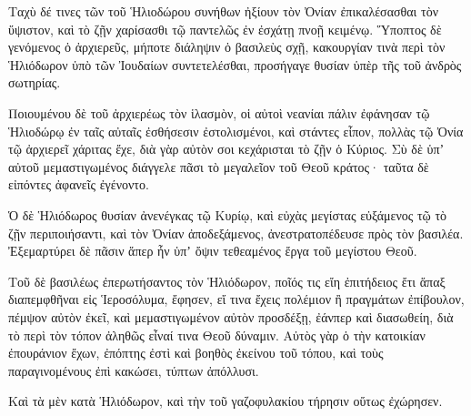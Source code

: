 {\par }{\PP {}Ταχὺ δέ τινες τῶν τοῦ Ἡλιοδώρου συνήθων ἠξίουν τὸν Ὀνίαν ἐπικαλέσασθαι τὸν ὕψιστον, καὶ τὸ ζῇν χαρίσασθι τῷ παντελῶς ἐν ἐσχάτῃ πνοῇ κειμένῳ.
Ὕποπτος δὲ γενόμενος ὁ ἀρχιερεῦς, μήποτε διάληψιν ὁ βασιλεὺς σχῇ, κακουργίαν τινὰ περὶ τὸν Ἡλιόδωρον ὑπὸ τῶν Ἰουδαίων συντετελέσθαι, προσήγαγε θυσίαν ὑπὲρ τῆς τοῦ ἀνδρὸς σωτηρίας.
\par }{\PP {}Ποιουμένου δὲ τοῦ ἀρχιερέως τὸν ἱλασμὸν, οἱ αὐτοὶ νεανίαι πάλιν ἐφάνησαν τῷ Ἡλιοδώρῳ ἐν ταῖς αὐταῖς ἐσθήσεσιν ἐστολισμένοι, καὶ στάντες εἶπον, πολλὰς τῷ Ὀνία τῷ ἀρχιερεῖ χάριτας ἔχε, διὰ γὰρ αὐτὸν σοι κεχάρισται τὸ ζῇν ὁ Κύριος.
Σὺ δὲ ὑπʼ αὐτοῦ μεμαστιγωμένος διάγγελε πᾶσι τὸ μεγαλεῖον τοῦ Θεοῦ κράτος· ταῦτα δὲ εἰπόντες ἀφανεῖς ἐγένοντο.
\par }{\PP {}Ὁ δὲ Ἡλιόδωρος θυσίαν ἀνενέγκας τῷ Κυρίῳ, καὶ εὐχὰς μεγίστας εὐξάμενος τῷ τὸ ζῇν περιποιήσαντι, καὶ τὸν Ὀνίαν ἀποδεξάμενος, ἀνεστρατοπέδευσε πρὸς τὸν βασιλέα.
Ἐξεμαρτύρει δὲ πᾶσιν ἅπερ ἦν ὑπʼ ὄψιν τεθεαμένος ἔργα τοῦ μεγίστου Θεοῦ.
\par }{\PP {}Τοῦ δὲ βασιλέως ἐπερωτήσαντος τὸν Ἡλιόδωρον, ποῖός τις εἴη ἐπιτήδειος ἔτι ἅπαξ διαπεμφθῆναι εἰς Ἱεροσόλυμα, ἔφησεν,
εἴ τινα ἔχεις πολέμιον ἢ πραγμάτων ἐπίβουλον, πέμψον αὐτὸν ἐκεῖ, καὶ μεμαστιγωμένον αὐτὸν προσδέξῃ, ἐάνπερ καὶ διασωθείη, διὰ τὸ περὶ τὸν τόπον ἀληθῶς εἶναί τινα Θεοῦ δύναμιν.
Αὐτὸς γὰρ ὁ τὴν κατοικίαν ἐπουράνιον ἔχων, ἐπόπτης ἐστὶ καὶ βοηθὸς ἐκείνου τοῦ τόπου, καὶ τοὺς παραγινομένους ἐπὶ κακώσει, τύπτων ἀπόλλυσι.
\par }{\PP {}Καὶ τὰ μὲν κατὰ Ἡλιόδωρον, καὶ τὴν τοῦ γαζοφυλακίου τήρησιν οὕτως ἐχώρησεν.

}
